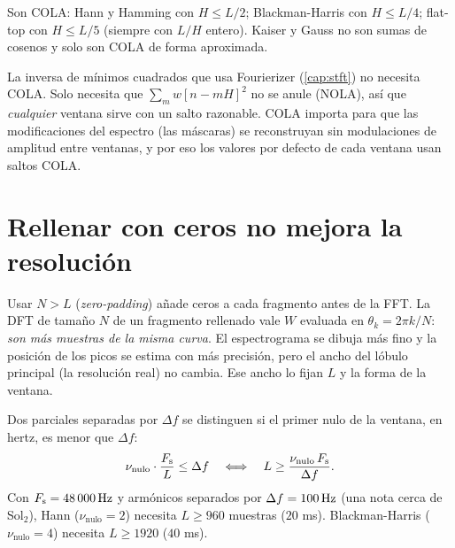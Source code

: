\begin{corolario}
Son COLA: Hann y Hamming con $H\le L/2$; Blackman-Harris con $H\le L/4$; flat-top con $H\le L/5$
(siempre con $L/H$ entero). Kaiser y Gauss no son sumas de cosenos y solo son COLA de forma
aproximada.
\end{corolario}

\begin{observacion}
La inversa de mínimos cuadrados que usa Fourierizer (\cref{cap:stft}) no necesita COLA. Solo
necesita que $\sum_m w[n-mH]^2$ no se anule (NOLA), así que \emph{cualquier} ventana sirve con un
salto razonable. COLA importa para que las modificaciones del espectro (las máscaras) se
reconstruyan sin modulaciones de amplitud entre ventanas, y por eso los valores por defecto de
cada ventana usan saltos COLA.
\end{observacion}

\section{Rellenar con ceros no mejora la resolución}

Usar $N>L$ (\emph{zero-padding}) añade ceros a cada fragmento antes de la FFT. La DFT de tamaño $N$
de un fragmento rellenado vale $W$ evaluada en $\theta_k=2\pi k/N$: \emph{son más muestras de la
misma curva}. El espectrograma se dibuja más fino y la posición de los picos se estima con más
precisión, pero el ancho del lóbulo principal (la resolución real) no cambia. Ese ancho lo fijan
$L$ y la forma de la ventana.

\begin{ejemplo}
Dos parciales separadas por $\Delta f$ se distinguen si el primer nulo de la ventana, en hertz,
es menor que $\Delta f$:
\[
  \nu_{\text{nulo}}\cdot\frac{F_{\mathrm{s}}}{L}\le\Delta f\quad\Longleftrightarrow\quad L\ge\frac{\nu_{\text{nulo}}\,F_{\mathrm{s}}}{\Delta f}.
\]
Con $F_{\mathrm{s}}=48\,000\,\mathrm{Hz}$ y armónicos separados por $\Delta f=100\,\mathrm{Hz}$ (una nota cerca de Sol$_2$),
Hann ($\nu_{\text{nulo}}=2$) necesita $L\ge960$ muestras ($20$ ms). Blackman-Harris
($\nu_{\text{nulo}}=4$) necesita $L\ge1920$ ($40$ ms).
\end{ejemplo}

